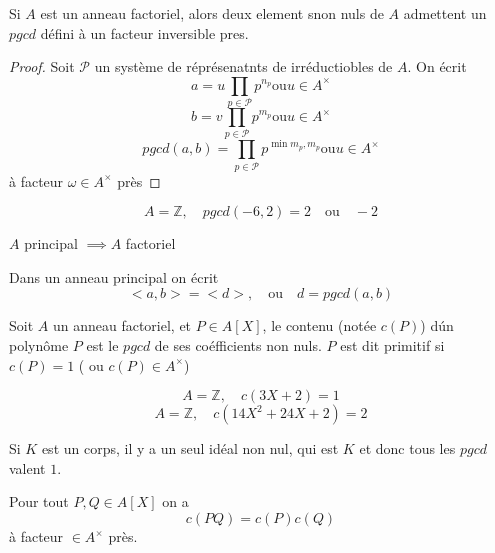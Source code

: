 \begin{prop}
	Si $A$ est un anneau factoriel, alors deux element snon nuls de $A$ admettent un $pgcd$ défini à un facteur inversible pres.
\end{prop}

\begin{proof}
	Soit $\mathcal{P}$ un système de réprésenatnts de irréductiobles de $A$.
	On écrit
	$$ a = u \prod\limits_{p \in \mathcal{P} } p^{n_p} \text{ou} u \in A^\times $$
	$$ b = v \prod \limits_{p \in \mathcal{P} } p^{m_p} \text{ou} u \in A^\times $$
	$$ pgcd(a,b)= \prod \limits_{p \in \mathcal{P}} p^{\min{m_p, m_p}} \text{ou} u \in A^\times $$
	à facteur $\omega \in A^\times$ près
\end{proof}

\begin{exemple}
	$$A  = \mathbb{Z}, \quad  pgcd(-6,2) = 2\quad \text{ou}\quad -2$$
\end{exemple}

\begin{theorem}[admis]
	$A$  principal $\implies A$ factoriel
\end{theorem}

\begin{prop}
	Dans un anneau principal on écrit
	$$ <a,b> = <d>, \quad \text{ou}\quad d = pgcd (a,b) $$
\end{prop}

\begin{definition}
	Soit $A$ un anneau factoriel, et $P \in A[X]$, le contenu (notée $c(P)$) dún polynôme $P$ est le
	$pgcd$ de ses coéfficients non nuls.
	$P$ est dit primitif si $c(P)=1$ ( ou $c(P) \in A^\times$)
\end{definition}


\begin{exemple}
	$$A  = \mathbb{Z}, \quad  c(3X + 2) = 1$$
	$$A  = \mathbb{Z}, \quad  c(14X^2 + 24X + 2) = 2$$
\end{exemple}

\begin{remarque}
	Si $K$ est un corps, il y a un seul idéal non nul, qui est $K$ et donc
	tous les $pgcd$ valent $1$.
\end{remarque}

\begin{lemme}
	Pour tout $P,Q \in A[X]$ on a
	$$ c(PQ) = c(P)c(Q)$$
	à facteur $\in A^\times$ près.
\end{lemme}

